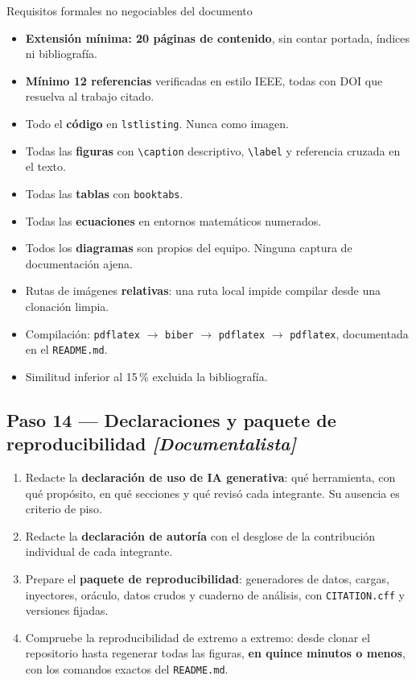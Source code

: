 \documentclass[11pt,a4paper]{article}
\newcommand{\paso}[1]{\subsection{#1}}
\begin{document}
	\begin{uteqbox}{Requisitos formales no negociables del documento}
		\begin{itemize}[leftmargin=*,itemsep=2pt]
			\item \textbf{Extensión mínima: 20 páginas de contenido}, sin contar portada, índices ni bibliografía.
			\item \textbf{Mínimo 12 referencias} verificadas en estilo IEEE, todas con DOI que resuelva al trabajo citado.
			\item Todo el \textbf{código} en \texttt{lstlisting}. Nunca como imagen.
			\item Todas las \textbf{figuras} con \texttt{\textbackslash caption} descriptivo, \texttt{\textbackslash label} y referencia cruzada en el texto.
			\item Todas las \textbf{tablas} con \texttt{booktabs}.
			\item Todas las \textbf{ecuaciones} en entornos matemáticos numerados.
			\item Todos los \textbf{diagramas} son propios del equipo. Ninguna captura de documentación ajena.
			\item Rutas de imágenes \textbf{relativas}: una ruta local impide compilar desde una clonación limpia.
			\item Compilación: \texttt{pdflatex} $\rightarrow$ \texttt{biber} $\rightarrow$ \texttt{pdflatex} $\rightarrow$ \texttt{pdflatex}, documentada en el \texttt{README.md}.
			\item Similitud inferior al 15\,\% excluida la bibliografía.
		\end{itemize}
	\end{uteqbox}
	
	\paso{Paso 14 --- Declaraciones y paquete de reproducibilidad \emph{[Documentalista]}}
	
	\begin{enumerate}[leftmargin=*,itemsep=4pt]
		\item Redacte la \textbf{declaración de uso de IA generativa}: qué herramienta, con qué propósito, en qué secciones y qué revisó cada integrante. Su ausencia es criterio de piso.
		\item Redacte la \textbf{declaración de autoría} con el desglose de la contribución individual de cada integrante.
		\item Prepare el \textbf{paquete de reproducibilidad}: generadores de datos, cargas, inyectores, oráculo, datos crudos y cuaderno de análisis, con \texttt{CITATION.cff} y versiones fijadas.
		\item Compruebe la reproducibilidad de extremo a extremo: desde clonar el repositorio hasta regenerar todas las figuras, \textbf{en quince minutos o menos}, con los comandos exactos del \texttt{README.md}.
	\end{enumerate}
	
\end{document}
